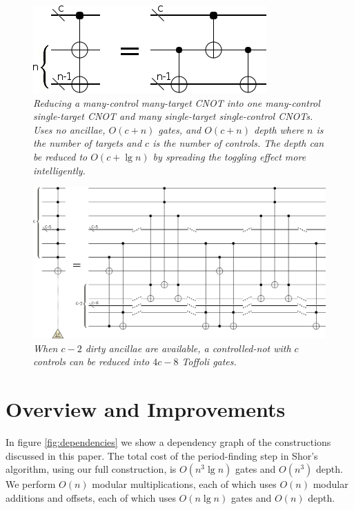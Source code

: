 \documentclass[twocolumn]{article}
\begin{document}
\begin{figure}
  \centering
  \includegraphics[width=\linewidth]{assets/multi-cnot-to-single-cnots.png}
  \caption{\em
    Reducing a many-control many-target CNOT into one many-control single-target CNOT and many single-target single-control CNOTs.
    Uses no ancillae, $O(c + n)$ gates, and $O(c + n)$ depth where $n$ is the number of targets and $c$ is the number of controls.
    The depth can be reduced to $O(c + \lg n)$ by spreading the toggling effect more intelligently.
  }
  \label{fig:multi-not}
\end{figure}

\begin{figure}
  \centering
  \includegraphics[width=\linewidth]{assets/cnot-reduction.png}
  \caption{\em
    When $c-2$ dirty ancillae are available, a controlled-not with $c$ controls can be reduced into $4c - 8$ Toffoli gates.
  }
  \label{fig:cnot-reduction}
\end{figure}

\section{Overview and Improvements} \label{sec:costs}

In figure \ref{fig:dependencies} we show a dependency graph of the constructions discussed in this paper.
The total cost of the period-finding step in Shor's algorithm, using our full construction, is $O(n^3 \lg n)$ gates and $O(n^3)$ depth.
We perform $O(n)$ modular multiplications, each of which uses $O(n)$ modular additions and offsets, each of which uses $O(n \lg n)$ gates \cite{haner2016} and $O(n)$ depth.
\end{document}

